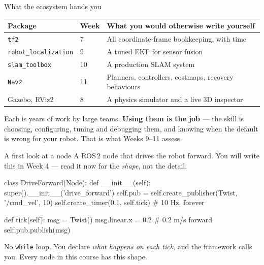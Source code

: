 \documentclass[aspectratio=169]{beamer}
\begin{document}
\begin{frame}{What the ecosystem hands you}
  \small
  \begin{center}
  \begin{tabular}{@{}llp{5.4cm}@{}}
    \toprule
    \textbf{Package} & \textbf{Week} & \textbf{What you would otherwise write yourself} \\
    \midrule
    \texttt{tf2}              & 7  & All coordinate-frame bookkeeping, with time \\
    \texttt{robot\_localization} & 9  & A tuned EKF for sensor fusion \\
    \texttt{slam\_toolbox}    & 10 & A production SLAM system \\
    \texttt{Nav2}             & 11 & Planners, controllers, costmaps, recovery behaviours \\
    Gazebo, RViz2             & 8  & A physics simulator and a live 3D inspector \\
    \bottomrule
  \end{tabular}
  \end{center}

  \vspace{0.3em}
  \begin{inthefield}
    \footnotesize
    Each is years of work by large teams. \textbf{Using them is the job} --- the skill is
    choosing, configuring, tuning and debugging them, and knowing when the default is wrong
    for your robot. That is what Weeks 9--11 assess.
  \end{inthefield}
\end{frame}

\begin{frame}[fragile]{A first look at a node}
  \small A ROS\,2 node that drives the robot forward. You will write this in Week 4 --- read
  it now for the \emph{shape}, not the detail.

  \begin{pycodes}
class DriveForward(Node):
    def __init__(self):
        super().__init__('drive_forward')
        self.pub = self.create_publisher(Twist, '/cmd_vel', 10)
        self.create_timer(0.1, self.tick)      # 10 Hz, forever

    def tick(self):
        msg = Twist()
        msg.linear.x = 0.2                     # 0.2 m/s forward
        self.pub.publish(msg)
  \end{pycodes}

  \vspace{0.4em}
  \footnotesize
  No \texttt{while} loop. You declare \emph{what happens on each tick}, and the framework
  calls you. Every node in this course has this shape.
\end{frame}
\end{document}
